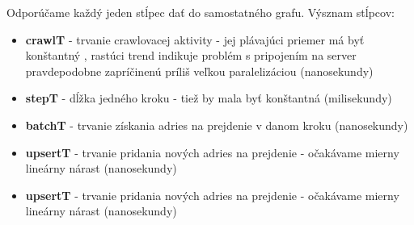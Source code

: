 Odporúčame každý jeden stĺpec dať do samostatného grafu. Výsznam stĺpcov: 
\begin{itemize}
    \item \textbf{crawlT} - trvanie crawlovacej aktivity - jej plávajúci priemer má byť konštantný , rastúci trend indikuje problém s pripojením na server pravdepodobne zapríčinenú príliš veľkou paralelizáciou (nanosekundy)
    \item \textbf{stepT} - dĺžka jedného kroku - tiež by mala byť konštantná (milisekundy)
    \item \textbf{batchT} - trvanie získania adries na prejdenie v danom kroku (nanosekundy)
    \item \textbf{upsertT} - trvanie pridania nových adries na prejdenie - očakávame mierny lineárny nárast (nanosekundy)
    \item \textbf{upsertT} - trvanie pridania nových adries na prejdenie - očakávame mierny lineárny nárast (nanosekundy)
\end{itemize}
